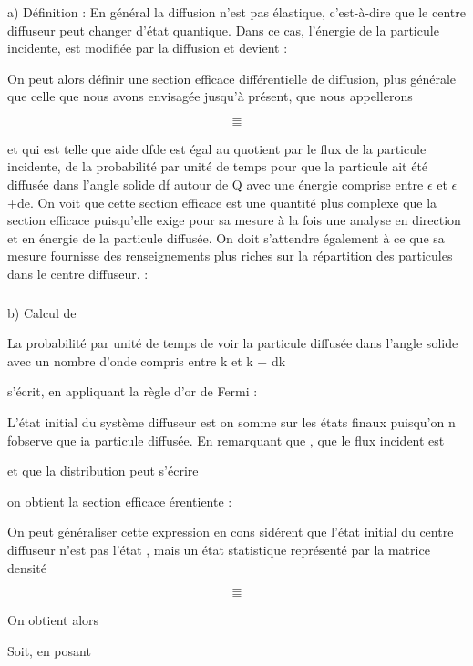 {{{\subsubsection{}%
a) Définition :
En général la diffusion n'est pas élastique, c'est-à-dire que le
centre diffuseur peut changer d'état quantique. Dans ce cas, l'énergie de la
particule incidente,  est modifiée par la diffusion et devient :

On peut alors définir une section efficace différentielle de diffusion, plus générale
que celle que nous avons envisagée jusqu'à présent, que nous appellerons

\[
\tag{122}=
\]
\[
\tag{123}=
\]

 et qui est telle que aide dfde est égal au quotient par le flux
de la particule incidente, de la probabilité par unité de temps pour que la
particule ait été diffusée dans l'angle solide df autour de Q avec une énergie comprise
entre $\epsilon$ et $\epsilon$ +de. On voit que cette section efficace est une
quantité plus complexe que la section efficace puisqu'elle exige pour
sa mesure à la fois une analyse en direction et en énergie de la particule
diffusée. On doit s'attendre également à ce que sa mesure fournisse des
renseignements plus riches sur la répartition des particules dans le centre
diffuseur. :

\subsubsection{}%
b) Calcul de 

La probabilité par unité de temps de voir la particule diffusée
dans l'angle solide  avec un nombre d'onde compris entre k et k + dk

s'écrit, en appliquant la règle d'or de Fermi :

L'état initial du système diffuseur est  on somme sur les états finaux
 puisqu'on n fobserve que ia particule diffusée.
En remarquant que  , que le flux incident est 

et que la distribution  peut s'écrire

on obtient la section efficace érentiente :

On peut généraliser cette expression en cons sidérent que l'état initial du centre
diffuseur n'est pas l'état  , mais un état statistique représenté par la
matrice densité

\[
\tag{127}=
\]
\[
\tag{128}=
\]


On obtient alors

Soit, en posant

}}}
